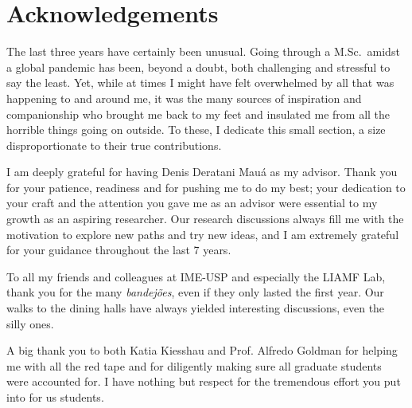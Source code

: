 


\chapter*{Acknowledgements}

The last three years have certainly been unusual. Going through a M.Sc.\ amidst a global pandemic
has been, beyond a doubt, both challenging and stressful to say the least. Yet, while at times
I might have felt overwhelmed by all that was happening to and around me, it was the many sources
of inspiration and companionship who brought me back to my feet and insulated me from all the
horrible things going on outside. To these, I dedicate this small section, a size disproportionate
to their true contributions.

I am deeply grateful for having Denis Deratani Mauá as my advisor. Thank you for your patience,
readiness and for pushing me to do my best; your dedication to your craft and the attention you
gave me as an advisor were essential to my growth as an aspiring researcher. Our research
discussions always fill me with the motivation to explore new paths and try new ideas, and I am
extremely grateful for your guidance throughout the last 7 years.

To all my friends and colleagues at IME-USP and especially the LIAMF Lab, thank you for the many
\emph{bandejões}, even if they only lasted the first year. Our walks to the dining halls have
always yielded interesting discussions, even the silly ones.

A big thank you to both Katia Kiesshau and Prof. Alfredo Goldman for helping me with all the red
tape and for diligently making sure all graduate students were accounted for. I have nothing but
respect for the tremendous effort you put into for us students.

